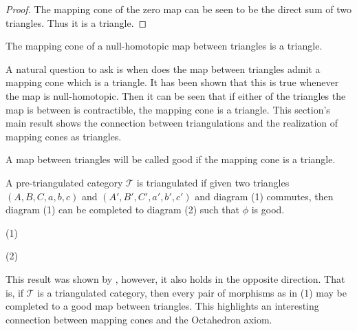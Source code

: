     \begin{proof}
        The mapping cone of the zero map can be seen to be the direct sum of two triangles. Thus it is a triangle.
    \end{proof}

    \begin{corollary}
        The mapping cone of a null-homotopic map between triangles is a triangle.
    \end{corollary}

    A natural question to ask is when does the map between triangles admit a mapping cone which is a triangle. It has been shown that this is true whenever the map is null-homotopic. Then it can be seen that if either of the triangles the map is between is contractible, the mapping cone is a triangle. This section's main result shows the connection between triangulations and the realization of mapping cones as triangles.

    \begin{definition}
        A map between triangles will be called good if the mapping cone is a triangle.
    \end{definition}

    \begin{theorem}
        A pre-triangulated category $\mathcal{T}$ is triangulated if given two triangles $(A,B,C,a,b,c)$ and $(A',B',C',a',b',c')$ and diagram (1) commutes, then diagram (1) can be completed to diagram (2) such that $\phi$ is good.
        \begin{center}
            (1)
            (2)
        \end{center}
    \end{theorem}

    This result was shown by \cite{neeman}, however, it also holds in the opposite direction. That is, if $\mathcal{T}$ is a triangulated category, then every pair of morphisms as in (1) may be completed to a good map between triangles. This highlights an interesting connection between mapping cones and the Octahedron axiom. 

